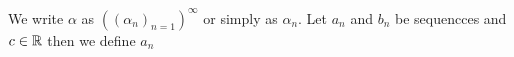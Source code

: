 \documentclass[11pt]{article}
\begin{document}
We write \(\alpha\) as \(((\alpha_n)_{n = 1})^\infty\) or simply as \(\alpha_n\). Let \(a_n\) and \(b_n\) be sequencces and \(c \in \mathbb R\) then we define \(a_n\) 
\end{document}
